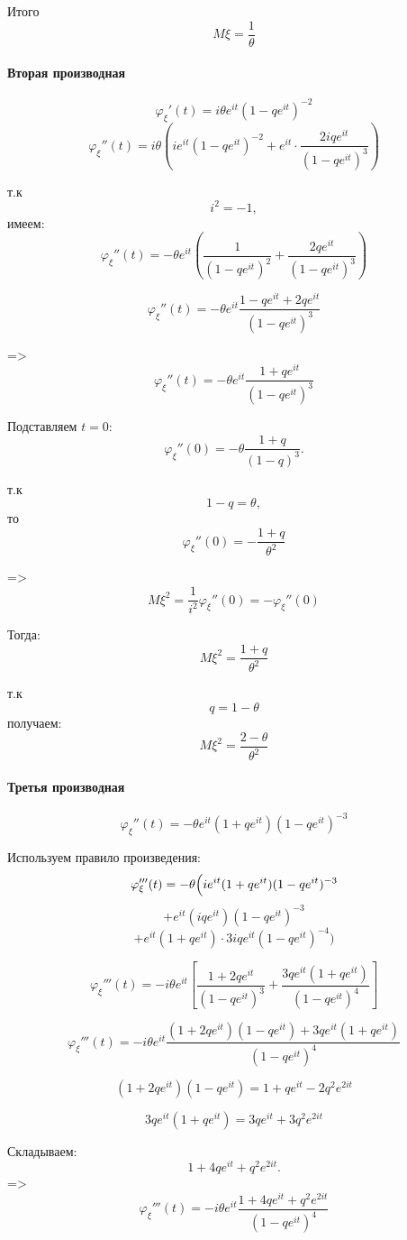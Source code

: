 \documentclass[12pt,a4paper]{article}
\theoremstyle{definition}
\begin{document}
Итого
\[\boxed{M\xi=\frac1{\theta}}\]

\paragraph{Вторая производная}

\[\varphi_\xi'(t)=i\theta e^{it}(1-qe^{it})^{-2}\]
\[\varphi_\xi''(t)=i\theta\left(
ie^{it}(1-qe^{it})^{-2}
+
e^{it}\cdot
\frac{2iqe^{it}}{(1-qe^{it})^3}
\right)\]

т.к
\[i^2=-1,\]
имеем:
\[\varphi_\xi''(t)=
-\theta e^{it}
\left(
\frac1{(1-qe^{it})^2}
+
\frac{2qe^{it}}{(1-qe^{it})^3}
\right)\]

\[\varphi_\xi''(t)
=
-\theta e^{it}\frac{
1-qe^{it}+2qe^{it}
}{
(1-qe^{it})^3
}\]

=>
\[\varphi_\xi''(t)=
-\theta e^{it}\frac{1+qe^{it}}{
(1-qe^{it})^3}\]

Подставляем $t=0$:
\[\varphi_\xi''(0)=
-\theta\frac{1+q}{(1-q)^3}.\]

т.к
\[1-q=\theta,\]
то
\[\varphi_\xi''(0)=-\frac{1+q}{\theta^2}\]

=>
\[M\xi^2=\frac1{i^2}\varphi_\xi''(0)=-\varphi_\xi''(0)\]

Тогда:
\[M\xi^2=\frac{1+q}{\theta^2}\]

т.к
\[q=1-\theta\]
получаем:
\[\boxed{M\xi^2=\frac{2-\theta}{\theta^2}}\]

\paragraph{Третья производная}

\[\varphi_\xi''(t)
=
-\theta e^{it}(1+qe^{it})(1-qe^{it})^{-3}\]

Используем правило произведения:
\[\varphi_\xi'''(t)
=
-\theta\Bigl(ie^{it}(1+qe^{it})(1-qe^{it})^{-3}\]
\[+e^{it}(iqe^{it})(1-qe^{it})^{-3}\]
\[+e^{it}(1+qe^{it})\cdot3iqe^{it}(1-qe^{it})^{-4}\Bigr)\]

\[\varphi_\xi'''(t)=-i\theta e^{it}\left[\frac{1+2qe^{it}}{(1-qe^{it})^3}+
\frac{3qe^{it}(1+qe^{it})}{(1-qe^{it})^4}\right]\]

\[\varphi_\xi'''(t)
=
-i\theta e^{it}
\frac{
(1+2qe^{it})(1-qe^{it})
+
3qe^{it}(1+qe^{it})
}{(1-qe^{it})^4}\]

\[(1+2qe^{it})(1-qe^{it})=1+qe^{it}-2q^2e^{2it}\]

\[3qe^{it}(1+qe^{it})=3qe^{it}+3q^2e^{2it}\]

Складываем:
\[1+4qe^{it}+q^2e^{2it}.\]
=>
\[\varphi_\xi'''(t)=
-i\theta e^{it}
\frac{
1+4qe^{it}+q^2e^{2it}
}{(1-qe^{it})^4}\]
\end{document}
